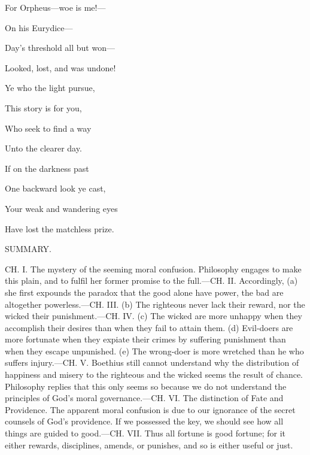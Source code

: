 For Orpheus—woe is me!—

On his Eurydice—

Day's threshold all but won—

Looked, lost, and was undone!

Ye who the light pursue,

This story is for you,

Who seek to find a way

Unto the clearer day.

If on the darkness past

One backward look ye cast,

Your weak and wandering eyes

Have lost the matchless prize.


SUMMARY.

CH. I. The mystery of the seeming moral confusion. Philosophy
engages to make this plain, and to fulfil her former promise to the
full.—CH. II. Accordingly, (a) she first expounds the paradox that
the good alone have power, the bad are altogether powerless.—CH.
III. (b) The righteous never lack their reward, nor the wicked
their punishment.—CH. IV. (c) The wicked are more unhappy when
they accomplish their desires than when they fail to attain them.
(d) Evil-doers are more fortunate when they expiate their crimes by
suffering punishment than when they escape unpunished. (e) The
wrong-doer is more wretched than he who suffers injury.—CH. V.
Boethius still cannot understand why the distribution of happiness
and misery to the righteous and the wicked seems the result of
chance. Philosophy replies that this only seems so because we do
not understand the principles of God's moral governance.—CH. VI.
The distinction of Fate and Providence. The apparent moral
confusion is due to our ignorance of the secret counsels of God's
providence. If we possessed the key, we should see how all things
are guided to good.—CH. VII. Thus all fortune is good fortune; for
it either rewards, disciplines, amends, or punishes, and so is
either useful or just.


